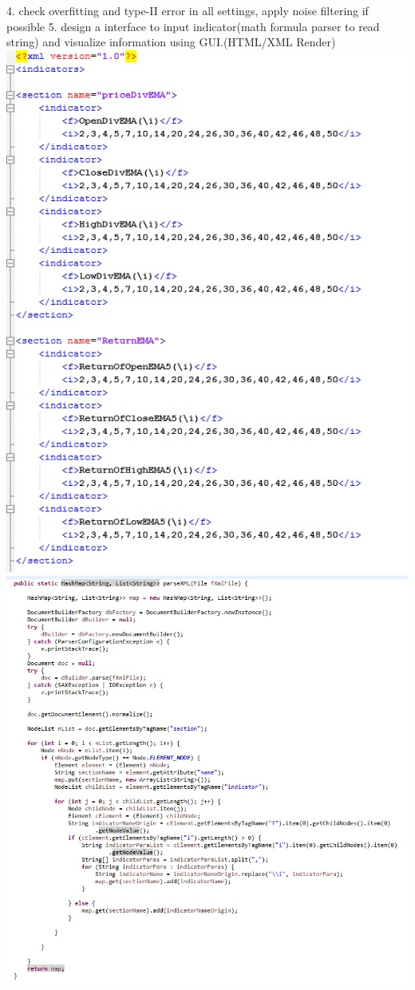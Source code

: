 \documentclass[11pt, openany]{book}              %
\begin{document}
4. check overfitting and type-II error in all settings, apply noise filtering if possible 
5. design a interface to input indicator(math formula parser to read string) and visualize information using GUI.(HTML/XML Render)
\includegraphics[scale=0.5]{9.JPG}
\includegraphics[scale=0.5]{10.JPG}
\end{document}
